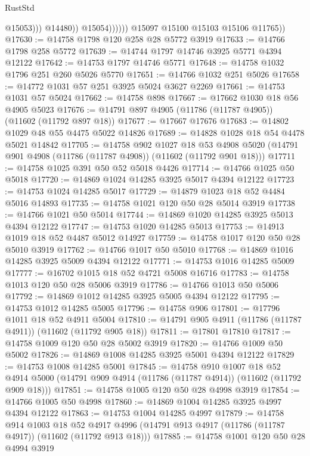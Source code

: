 \begin{lexlean}{RustStd}
\begin{coremodule}
                              @15053)))
                        @14480))
                    @15054))))))
        @15097
        @15100
        @15103
        @15106
        @11765))
@17630 := @14758 @1798 @120 @258 @28 @5772 @3919
@17633 := @14766 @1798 @258 @5772
@17639 := @14744 @1797 @14746 @3925 @5771 @4394 @12122
@17642 := @14753 @1797 @14746 @5771
@17648 := @14758 @1032 @1796 @251 @260 @5026 @5770
@17651 := @14766 @1032 @251 @5026
@17658 := @14772 @1031 @57 @251 @3925 @5024 @3627 @2269
@17661 := @14753 @1031 @57 @5024
@17662 := @14758 @898
@17667 := @17662 @1030 @18 @56 @4905 @5023
@17676 := @14791 @897 @4905 (@11786 (@11787 @4905)) (@11602 (@11792 @897 @18))
@17677 := @17667 @17676
@17683 := @14802 @1029 @48 @55 @4475 @5022 @14826
@17689 := @14828 @1028 @18 @54 @4478 @5021 @14842
@17705 := @14758
    @902
    @1027
    @18
    @53
    @4908
    @5020
    (@14791 @901 @4908 (@11786 (@11787 @4908)) (@11602 (@11792 @901 @18)))
@17711 := @14758 @1025 @391 @50 @52 @5018 @4426
@17714 := @14766 @1025 @50 @5018
@17720 := @14869 @1024 @14285 @3925 @5017 @4394 @12122
@17723 := @14753 @1024 @14285 @5017
@17729 := @14879 @1023 @18 @52 @4484 @5016 @14893
@17735 := @14758 @1021 @120 @50 @28 @5014 @3919
@17738 := @14766 @1021 @50 @5014
@17744 := @14869 @1020 @14285 @3925 @5013 @4394 @12122
@17747 := @14753 @1020 @14285 @5013
@17753 := @14913 @1019 @18 @52 @4487 @5012 @14927
@17759 := @14758 @1017 @120 @50 @28 @5010 @3919
@17762 := @14766 @1017 @50 @5010
@17768 := @14869 @1016 @14285 @3925 @5009 @4394 @12122
@17771 := @14753 @1016 @14285 @5009
@17777 := @16702 @1015 @18 @52 @4721 @5008 @16716
@17783 := @14758 @1013 @120 @50 @28 @5006 @3919
@17786 := @14766 @1013 @50 @5006
@17792 := @14869 @1012 @14285 @3925 @5005 @4394 @12122
@17795 := @14753 @1012 @14285 @5005
@17796 := @14758 @906
@17801 := @17796 @1011 @18 @52 @4911 @5004
@17810 := @14791 @905 @4911 (@11786 (@11787 @4911)) (@11602 (@11792 @905 @18))
@17811 := @17801 @17810
@17817 := @14758 @1009 @120 @50 @28 @5002 @3919
@17820 := @14766 @1009 @50 @5002
@17826 := @14869 @1008 @14285 @3925 @5001 @4394 @12122
@17829 := @14753 @1008 @14285 @5001
@17845 := @14758
    @910
    @1007
    @18
    @52
    @4914
    @5000
    (@14791 @909 @4914 (@11786 (@11787 @4914)) (@11602 (@11792 @909 @18)))
@17851 := @14758 @1005 @120 @50 @28 @4998 @3919
@17854 := @14766 @1005 @50 @4998
@17860 := @14869 @1004 @14285 @3925 @4997 @4394 @12122
@17863 := @14753 @1004 @14285 @4997
@17879 := @14758
    @914
    @1003
    @18
    @52
    @4917
    @4996
    (@14791 @913 @4917 (@11786 (@11787 @4917)) (@11602 (@11792 @913 @18)))
@17885 := @14758 @1001 @120 @50 @28 @4994 @3919

\end{coremodule}
\end{lexlean}
